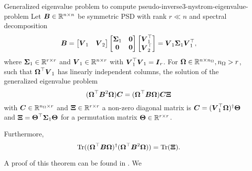 \begin{theorem}{Generalized eigenvalue problem to compute pseudo-inverse}{3-nystrom-eigenvalue-problem}
    Let $\boldsymbol{B} \in \mathbb{R}^{n \times n}$ be symmetric \gls{PSD} with rank $r \ll n$ and
    spectral decomposition 
    \begin{equation}
        \boldsymbol{B}
        = \begin{bmatrix} \boldsymbol{V}_1 & \boldsymbol{V}_2 \end{bmatrix} 
          \begin{bmatrix} \boldsymbol{\Sigma}_1 & \boldsymbol{0} \\ \boldsymbol{0} & \boldsymbol{0} \end{bmatrix} 
          \begin{bmatrix} \boldsymbol{V}_1^{\top} \\ \boldsymbol{V}_2^{\top} \end{bmatrix}
        = \boldsymbol{V}_1 \boldsymbol{\Sigma}_1 \boldsymbol{V}_1^{\top},
        \label{equ:3-nystrom-eigenvalue-problem-spectral-decomposition}
    \end{equation}
    where $\boldsymbol{\Sigma}_1 \in \mathbb{R}^{r \times r}$ and
    $\boldsymbol{V}_1 \in \mathbb{R}^{n \times r}$ with $\boldsymbol{V}_1^{\top} \boldsymbol{V}_1 = \boldsymbol{I}_r$.
    For $\boldsymbol{\Omega} \in \mathbb{R}^{n \times n_{\Omega}}, n_{\Omega} > r$,
    such that $\boldsymbol{\Omega}^{\top} \boldsymbol{V}_1$ has linearly independent columns,
    the solution of the generalized eigenvalue problem
    \begin{equation}
        (\boldsymbol{\Omega}^{\top} \boldsymbol{B}^2 \boldsymbol{\Omega}) \boldsymbol{C} = (\boldsymbol{\Omega}^{\top} \boldsymbol{B} \boldsymbol{\Omega}) \boldsymbol{C}  \boldsymbol{\Xi}
        \label{equ:3-nystrom-low-rank-eigenvalue-problem}
    \end{equation}
    with $\boldsymbol{C} \in \mathbb{R}^{n_{\Omega} \times r}$ and $\boldsymbol{\Xi} \in \mathbb{R}^{r \times r}$ a 
    non-zero diagonal matrix is $\boldsymbol{C} = (\boldsymbol{V}_1^{\top} \boldsymbol{\Omega})^{\dagger} \boldsymbol{\Theta}$
    and $\boldsymbol{\Xi} = \boldsymbol{\Theta}^{\top} \boldsymbol{\Sigma}_1 \boldsymbol{\Theta}$
    for a permutation matrix $\boldsymbol{\Theta} \in \mathbb{R}^{r \times r}$.

    Furthermore,
    \begin{equation}
        \operatorname{Tr}((\boldsymbol{\Omega}^{\top} \boldsymbol{B} \boldsymbol{\Omega})^{\dagger}(\boldsymbol{\Omega}^{\top} \boldsymbol{B}^2 \boldsymbol{\Omega})) = \operatorname{Tr}(\boldsymbol{\Xi}).
        \label{equ:3-nystrom-low-rank-trace-equalities}
    \end{equation}
\end{theorem}
A proof of this theorem can be found in \cite[theorem~3]{lin2017randomized}. We
